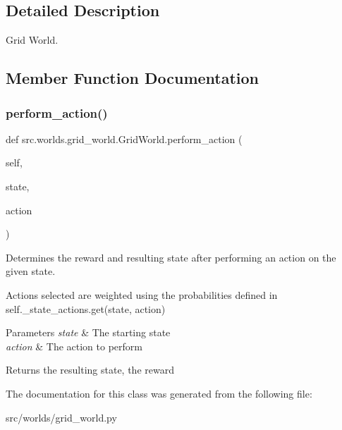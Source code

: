 \subsection{Detailed Description}
Grid World. 

\subsection{Member Function Documentation}
\mbox{\label{classsrc_1_1worlds_1_1grid__world_1_1_grid_world_a93de8a88475e8ad0530fe703343028c9}} 
\subsubsection{\texorpdfstring{perform\+\_\+action()}{perform\_action()}}
{\footnotesize\ttfamily def src.\+worlds.\+grid\+\_\+world.\+Grid\+World.\+perform\+\_\+action (\begin{DoxyParamCaption}\item[{}]{self,  }\item[{}]{state,  }\item[{}]{action }\end{DoxyParamCaption})}



Determines the reward and resulting state after performing an action on the given state. 

Actions selected are weighted using the probabilities defined in self.\+\_\+state\+\_\+actions.\+get(state, action)


\begin{DoxyParams}{Parameters}
{\em state} & The starting state \\
\hline
{\em action} & The action to perform \\
\hline
\end{DoxyParams}
\begin{DoxyReturn}{Returns}
the resulting state, the reward 
\end{DoxyReturn}


The documentation for this class was generated from the following file\+:\begin{DoxyCompactItemize}
\item 
src/worlds/grid\+\_\+world.\+py\end{DoxyCompactItemize}
